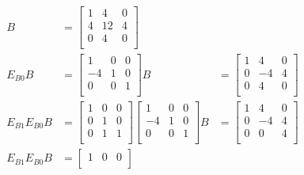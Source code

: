 \documentclass[12pt,letterpaper]{article}
\begin{document}
\begin{enumerate}
\begin{enumerate}
          \begin{align*}
            B
            &=
            \begin{bmatrix}
               1 &  4 &  0 \\
               4 & 12 &  4 \\
               0 &  4 &  0 \\
            \end{bmatrix}
            \\
            E_{B0}B
            &=
            \begin{bmatrix}
               1 &  0 &  0 \\
              -4 &  1 &  0 \\
               0 &  0 &  1 \\
            \end{bmatrix}
            B
            &=
            \begin{bmatrix}
               1 &  4 &  0 \\
               0 & -4 &  4 \\
               0 &  4 &  0 \\
            \end{bmatrix}
            \\
            E_{B1}E_{B0}B
            &=
            \begin{bmatrix}
               1 &  0 &  0 \\
               0 &  1 &  0 \\
               0 &  1 &  1 \\
            \end{bmatrix}
            \begin{bmatrix}
               1 &  0 &  0 \\
              -4 &  1 &  0 \\
               0 &  0 &  1 \\
            \end{bmatrix}
            B
            &=
            \begin{bmatrix}
               1 &  4 &  0 \\
               0 & -4 &  4 \\
               0 &  0 &  4 \\
            \end{bmatrix}
            \\
            E_{B1}E_{B0}B
            &=
            \begin{bmatrix}
               1 &  0 &  0 \\

\end{bmatrix}
\end{align*}
\end{enumerate}
\end{enumerate}
\end{document}
